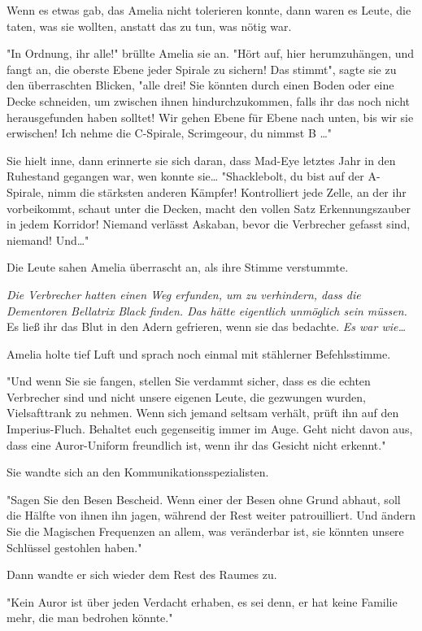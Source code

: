 {Wenn es etwas gab, das Amelia nicht tolerieren konnte, dann waren es Leute, die taten, was sie wollten, anstatt das zu tun, was nötig war.

"In Ordnung, ihr alle!" brüllte Amelia sie an. "Hört auf, hier herumzuhängen, und fangt an, die oberste Ebene jeder Spirale zu sichern! Das stimmt", sagte sie zu den überraschten Blicken, "alle drei! Sie könnten durch einen Boden oder eine Decke schneiden, um zwischen ihnen hindurchzukommen, falls ihr das noch nicht herausgefunden haben solltet! Wir gehen Ebene für Ebene nach unten, bis wir sie erwischen! Ich nehme die C-Spirale, Scrimgeour, du nimmst B …"

Sie hielt inne, dann erinnerte sie sich daran, dass Mad-Eye letztes Jahr in den Ruhestand gegangen war, wen konnte sie… "Shacklebolt, du bist auf der A-Spirale, nimm die stärksten anderen Kämpfer! Kontrolliert jede Zelle, an der ihr vorbeikommt, schaut unter die Decken, macht den vollen Satz Erkennungszauber in jedem Korridor! Niemand verlässt Askaban, bevor die Verbrecher gefasst sind, niemand! Und…"

Die Leute sahen Amelia überrascht an, als ihre Stimme verstummte.

\emph{Die Verbrecher hatten einen Weg erfunden, um zu verhindern, dass die Dementoren Bellatrix Black finden. Das hätte eigentlich unmöglich sein müssen.} Es ließ ihr das Blut in den Adern gefrieren, wenn sie das bedachte. \emph{Es war wie…}

Amelia holte tief Luft und sprach noch einmal mit stählerner Befehlsstimme.

"Und wenn Sie sie fangen, stellen Sie verdammt sicher, dass es die echten Verbrecher sind und nicht unsere eigenen Leute, die gezwungen wurden, Vielsafttrank zu nehmen. Wenn sich jemand seltsam verhält, prüft ihn auf den Imperius-Fluch. Behaltet euch gegenseitig immer im Auge. Geht nicht davon aus, dass eine Auror-Uniform freundlich ist, wenn ihr das Gesicht nicht erkennt."

Sie wandte sich an den Kommunikationsspezialisten.

"Sagen Sie den Besen Bescheid. Wenn einer der Besen ohne Grund abhaut, soll die Hälfte von ihnen ihn jagen, während der Rest weiter patrouilliert. Und ändern Sie die Magischen Frequenzen an allem, was veränderbar ist, sie könnten unsere Schlüssel gestohlen haben."

Dann wandte er sich wieder dem Rest des Raumes zu.

"Kein Auror ist über jeden Verdacht erhaben, es sei denn, er hat keine Familie mehr, die man bedrohen könnte."

}
